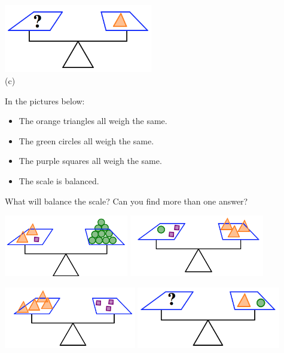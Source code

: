 \begin{problem}
\begin{center}
\includegraphics[height=3cm]{balance2d3}\\
(c)

\end{center}

\end{problem}


\newpage


\begin{problem}\label{prob: balance3}
In the pictures below:
\begin{itemize}
\item
The orange triangles all weigh the same.  
\item
The green circles all weigh the same.  
\item
The purple squares all weigh the same.  
\item
The scale is balanced.
\end{itemize}
 What will balance the scale?  Can you find more than one answer?
\begin{center}
\includegraphics[height=2.7cm]{balance3a}\quad
\includegraphics[height=2.7cm]{balance3b}

\bigskip

\includegraphics[height=2.7cm]{balance3c}\quad
\includegraphics[height=2.7cm]{balance3d}

\end{center}

\end{problem}

